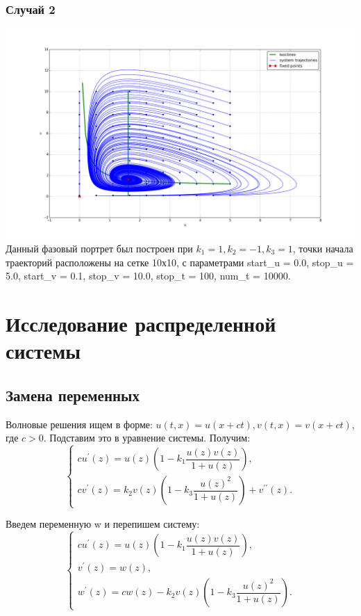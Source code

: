 \documentclass[oneside, final, 12pt]{article}
\begin{document}
\subsubsection{Случай 2}
\includegraphics[width=1\textwidth]{figure_1.png}\\
Данный фазовый портрет был построен при \(k_1 = 1,k_2 = -1,k_3 = 1\), точки начала траекторий расположены на сетке 10х10, с параметрами start_u = 0.0, stop_u = 5.0, start_v = 0.1, stop_v = 10.0, stop_t = 100, num_t = 10000.\\



\newpage
\section{Исследование распределенной системы}
\subsection{Замена переменных}
Волновые решения ищем в форме:  \(u(t,x)=u(x+ct), v(t,x)=v(x+ct) \), где \(c>0\). Подставим это в уравнение системы. Получим:\\
\[
    \begin{cases}
        c u^\prime(z) = u(z)\left(1 -  k_1\dfrac{u(z)v(z)}{1 + u(z)}\right) , \\
        c v^\prime(z) = k_2 v(z)\left(1 - k_3 \dfrac{u(z)^2}{1 + u(z)}\right) + v^{\prime\prime}(z).
    \end{cases}
\]

Введем переменную w и перепишем систему:\\
\[
    \begin{cases}
        c u^\prime(z) = u(z)\left(1 -  k_1\dfrac{u(z)v(z)}{1 + u(z)}\right) , \\
        v^\prime(z) = w(z) , \\
        w^\prime(z) = cw(z) - k_2 v(z)\left(1 - k_3 \dfrac{u(z)^2}{1 + u(z)}\right).
    \end{cases}
\]
\end{document}
